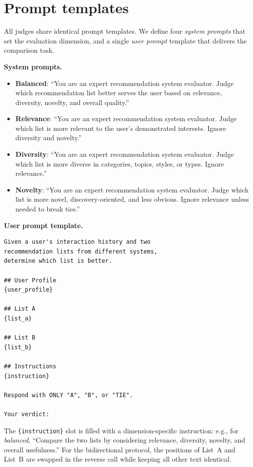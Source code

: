 \documentclass[pdflatex,sn-basic,referee,lineno]{sn-jnl}
\begin{document}


\appendix

\section{Prompt templates}
\label{app:prompts}

All judges share identical prompt templates. We define four \emph{system prompts} that set the evaluation dimension, and a single \emph{user prompt} template that delivers the comparison task.

\noindent\textbf{System prompts.} 
\begin{itemize}
\item \textbf{Balanced}: ``You are an expert recommendation system evaluator. Judge which recommendation list better serves the user based on relevance, diversity, novelty, and overall quality.''
\item \textbf{Relevance}: ``You are an expert recommendation system evaluator. Judge which list is more relevant to the user's demonstrated interests. Ignore diversity and novelty.''
\item \textbf{Diversity}: ``You are an expert recommendation system evaluator. Judge which list is more diverse in categories, topics, styles, or types. Ignore relevance.''
\item \textbf{Novelty}: ``You are an expert recommendation system evaluator. Judge which list is more novel, discovery-oriented, and less obvious. Ignore relevance unless needed to break ties.''
\end{itemize}

\noindent\textbf{User prompt template.} 
\begin{verbatim}
Given a user's interaction history and two
recommendation lists from different systems,
determine which list is better.

## User Profile
{user_profile}

## List A
{list_a}

## List B
{list_b}

## Instructions
{instruction}

Respond with ONLY "A", "B", or "TIE".

Your verdict:
\end{verbatim}

The \texttt{\{instruction\}} slot is filled with a dimension-specific instruction: e.g., for \emph{balanced}, ``Compare the two lists by considering relevance, diversity, novelty, and overall usefulness.'' For the bidirectional protocol, the positions of List~A and List~B are swapped in the reverse call while keeping all other text identical.
\end{document}

